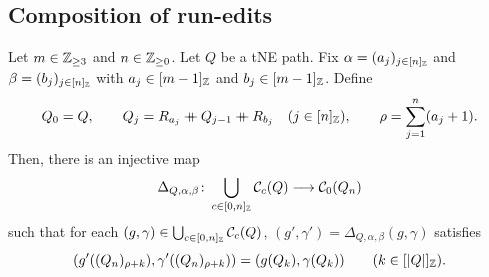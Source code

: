 \subsection{Composition of run-edits}
\begin{lemma}\label{lem:surplus-reduction}
Let $m\in\mathbb Z_{\ge3}$ and $n\in\mathbb Z_{\ge0}$.
Let $Q$ be a tNE path.
Fix $\alpha=(a_j)_{j\in[n]_{\mathbb Z}}$ and
$\beta=(b_j)_{j\in[n]_{\mathbb Z}}$ with $a_j\in[m-1]_{\mathbb Z}$ and $b_j\in[m-1]_{\mathbb Z}$.
Define
\[
 Q_0=Q,\qquad Q_j=R_{a_j}\mathbin{+\mkern-10mu+} Q_{j-1}\mathbin{+\mkern-10mu+} R_{b_j}\quad(j\in[n]_{\mathbb Z}),
 \qquad \rho=\sum_{j=1}^n(a_j+1).
\]
Then, there is an injective map
\begin{equation}\label{eq:surplus-reduction-map}
 \Delta_{Q,\alpha,\beta}\colon
 \bigcup_{c\in[0,n]_{\mathbb Z}}\mathcal C_c(Q)\longrightarrow\mathcal C_0(Q_n)
\end{equation}
such that for each $(g,\gamma)\in\bigcup_{c\in[0,n]_{\mathbb Z}}\mathcal C_c(Q)$,
$(g',\gamma')=\Delta_{Q,\alpha,\beta}(g,\gamma)$ satisfies
\begin{equation}\label{eq:surplus-reduction-restriction}
 (g'((Q_n)_{\rho+k}),\gamma'((Q_n)_{\rho+k}))
 =(g(Q_k),\gamma(Q_k))\qquad(k\in[|Q|]_{\mathbb Z}).
\end{equation}
\end{lemma}
